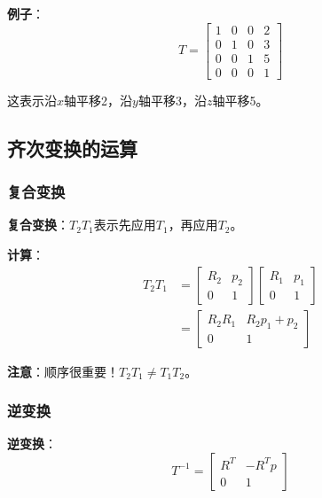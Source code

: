 \documentclass[12pt,a4paper]{article}
\begin{document}
\textbf{例子}：
\begin{equation}
T = \begin{bmatrix} 1 & 0 & 0 & 2 \\ 0 & 1 & 0 & 3 \\ 0 & 0 & 1 & 5 \\ 0 & 0 & 0 & 1 \end{bmatrix}
\end{equation}

这表示沿$x$轴平移2，沿$y$轴平移3，沿$z$轴平移5。

\subsection{齐次变换的运算}

\subsubsection{复合变换}

\textbf{复合变换}：$T_2 T_1$表示先应用$T_1$，再应用$T_2$。

\textbf{计算}：
\begin{align}
T_2 T_1 &= \begin{bmatrix} R_2 & p_2 \\ 0 & 1 \end{bmatrix} \begin{bmatrix} R_1 & p_1 \\ 0 & 1 \end{bmatrix} \\
&= \begin{bmatrix} R_2 R_1 & R_2 p_1 + p_2 \\ 0 & 1 \end{bmatrix}
\end{align}

\textbf{注意}：顺序很重要！$T_2 T_1 \neq T_1 T_2$。

\subsubsection{逆变换}

\textbf{逆变换}：
\begin{equation}
T^{-1} = \begin{bmatrix} R^T & -R^T p \\ 0 & 1 \end{bmatrix}
\end{equation}
\end{document}
